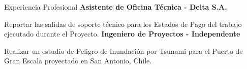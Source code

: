 \begin{rubric}{Experiencia Profesional}
\entry*[2015]%
	\textbf{Asistente de Oficina Técnica - Delta S.A.}
	\par Reportar las salidas de soporte técnico para los Estados de Pago del trabajo ejecutado durante el Proyecto.
%
%
\entry*[2013 - 2014]%
	\textbf{Ingeniero de Proyectos - Independente}
	\par Realizar un estudio de Peligro de Inundación por Tsunami para el Puerto de Gran Escala proyectado en San Antonio, Chile.
\end{rubric}
